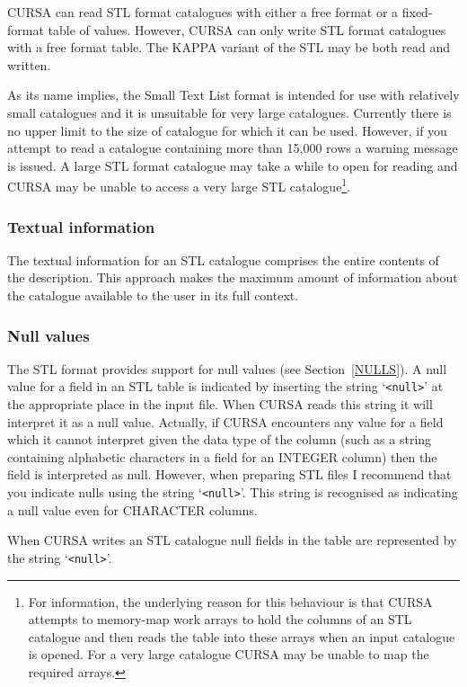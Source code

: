 \documentclass[twoside,11pt]{starlink}
\begin{document}
CURSA can read STL format catalogues with either a free format or a
fixed-format table of values.  However, CURSA can only write STL format
catalogues with a free format table.  The KAPPA variant of the STL may be
both read and written.

As its name implies, the Small Text List format is intended for use
with relatively small catalogues and it is unsuitable for very large
catalogues.  Currently there is no upper limit to the size of catalogue
for which it can be used.  However, if you attempt to read a catalogue
containing more than 15,000 rows a warning message is issued.  A large STL
format catalogue may take a while to open for reading and CURSA may be
unable to access a very large STL catalogue\footnote{For
information, the underlying reason for this behaviour is that CURSA
attempts to memory-map work arrays to hold the columns of an STL
catalogue and then reads the table into these arrays when an input
catalogue is opened.  For a very large catalogue CURSA may be unable to
map the required arrays.}.

\subsubsection{Textual information}

The textual information for an STL catalogue comprises the entire contents
of the description. This approach makes the maximum amount of information
about the catalogue available to the user in its full context.

\subsubsection{\label{STLNULL}Null values}

The STL format provides support for null values (see Section~\ref{NULLS}).
A null value for a field in an STL table is indicated by inserting
the string `\verb-<null>-' at the appropriate place in the input file.
When CURSA reads this string it will interpret it as a null value.
Actually, if CURSA encounters any value for a field which it cannot
interpret given the data type of the column (such as a string containing
alphabetic characters in a field for an INTEGER column) then the field
is interpreted as null.  However, when preparing STL files I recommend
that you indicate nulls using the string `\verb-<null>-'.  This string
is recognised as indicating a null value even for CHARACTER columns.

When CURSA writes an STL catalogue null fields in the table are
represented by the string `\verb-<null>-'.
\end{document}

